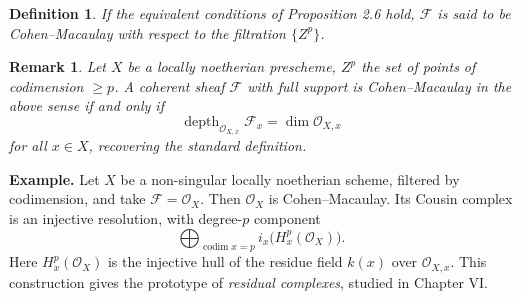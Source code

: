 \documentclass[12pt]{book}
\newcommand{\sheaf}[1]{\mathcal{#1}}
\theoremstyle{plain}
\newtheorem{definition}{Definition}[section]
\newtheorem{remark}{Remark}[section]
\begin{document}
\begin{definition}
If the equivalent conditions of Proposition 2.6 hold, \(\sheaf{F}\) is said to be \textit{Cohen--Macaulay} with respect to the filtration \(\{Z^p\}\).
\end{definition}

\begin{remark}
Let \(X\) be a locally noetherian prescheme, \(Z^p\) the set of points of codimension \(\ge p\). A coherent sheaf \(\sheaf{F}\) with full support is Cohen--Macaulay in the above sense if and only if
\[
\operatorname{depth}_{\sheaf{O}_{X,x}} \sheaf{F}_x = \dim\sheaf{O}_{X,x}
\]
for all \(x\in X\), recovering the standard definition.
\end{remark}

\setcounter{page}{239}
\noindent\textbf{Example.}
Let \(X\) be a non-singular locally noetherian scheme, filtered by codimension, and take \(\sheaf{F}=\sheaf{O}_X\). Then \(\sheaf{O}_X\) is Cohen--Macaulay. Its Cousin complex is an injective resolution, with degree-\(p\) component
\[
\bigoplus_{\operatorname{codim}x=p} i_x\big(H_x^p(\sheaf{O}_X)\big).
\]
Here \(H_x^p(\sheaf{O}_X)\) is the injective hull of the residue field \(k(x)\) over \(\sheaf{O}_{X,x}\). This construction gives the prototype of \textit{residual complexes}, studied in Chapter VI.
\end{document}
